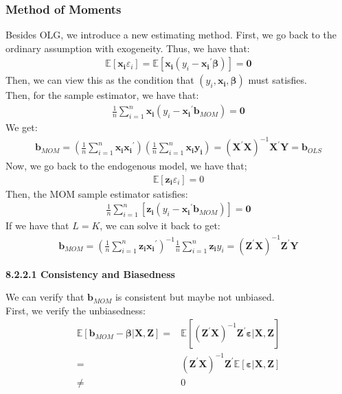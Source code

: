 \documentclass{article}
\begin{document}
\subsubsection{Method of Moments}
Besides OLG, we introduce a new estimating method. First, we go back to the ordinary assumption with exogeneity. Thus, we have that:
	\begin{align*}
		\mathbb{E}[\boldsymbol{x_i} \varepsilon_i] = \mathbb{E}[\boldsymbol{x_i}(y_i - \boldsymbol{x_i}^\prime \boldsymbol{\beta})] = \boldsymbol{0}
	\end{align*}
Then, we can view this as the condition that $(y_i, \boldsymbol{x_i}, \boldsymbol{\beta})$ must satisfies.\\
Then, for the sample estimator, we have that:
	\begin{align*}
		\frac{1}{n}\sum^n_{i=1} \boldsymbol{x_i}(y_i - \boldsymbol{x_i}^\prime \boldsymbol{b}_{MOM}) = \boldsymbol{0}
	\end{align*}
We get:
	\begin{align*}
		\boldsymbol{b}_{MOM} = \left( \frac{1}{n}\sum^n_{i=1} \boldsymbol{x_i}\boldsymbol{x_i}^\prime \right) \left( \frac{1}{n}\sum^n_{i=1} \boldsymbol{x_i}\boldsymbol{y_i} \right) = (\boldsymbol{X}^\prime \boldsymbol{X})^{-1} \boldsymbol{X}^\prime \boldsymbol{Y} = \boldsymbol{b}_{OLS}
	\end{align*}
Now, we go back to the endogenous model, we have that;
	\begin{align*}
		\mathbb{E}[\boldsymbol{z_i}\varepsilon_i] = 0
	\end{align*}
Then, the MOM sample estimator satisfies:
	\begin{align*}
		\frac{1}{n} \sum^n_{i=1} [\boldsymbol{z_i}(y_i - \boldsymbol{x_i}^\prime \boldsymbol{b}_{MOM})] = \boldsymbol{0}
	\end{align*}
If we have that $L = K$, we can solve it back to get:
	\begin{align*}
		\boldsymbol{b}_{MOM} = \left( \frac{1}{n} \sum^n_{i=1} \boldsymbol{z_i} \boldsymbol{x_i}^\prime \right)^{-1} \frac{1}{n} \sum^n_{i=1} \boldsymbol{z_i}y_i = (\boldsymbol{Z}^\prime \boldsymbol{X})^{-1} \boldsymbol{Z}^\prime \boldsymbol{Y}
	\end{align*}
\centerline{\textbf{8.2.2.1 Consistency and Biasedness}}
We can verify that $\boldsymbol{b}_{MOM}$ is consistent but maybe not unbiased.\\
First, we verify the unbiasedness:
	\begin{align*}
		\mathbb{E}[\boldsymbol{b}_{MOM} - \boldsymbol{\beta} | \boldsymbol{X}, \boldsymbol{Z}] = &\mathbb{E}[(\boldsymbol{Z}^\prime \boldsymbol{X})^{-1} \boldsymbol{Z}^\prime \boldsymbol{\varepsilon} | \boldsymbol{X}, \boldsymbol{Z}]\\ = &
		(\boldsymbol{Z}^\prime \boldsymbol{X})^{-1} \boldsymbol{Z}^\prime \mathbb{E}[\boldsymbol{\varepsilon} | \boldsymbol{X}, \boldsymbol{Z}]\\ \neq &
		0
	\end{align*}
\end{document}
